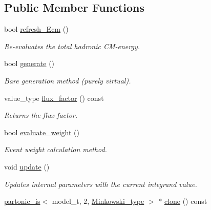 \subsection*{Public Member Functions}
\begin{DoxyCompactItemize}
\item 
\hypertarget{a00414_a5e0fcbdf96342a44eabb3c1c96d237b7}{}bool \hyperlink{a00414_a5e0fcbdf96342a44eabb3c1c96d237b7}{refresh\+\_\+\+Ecm} ()\label{a00414_a5e0fcbdf96342a44eabb3c1c96d237b7}

\begin{DoxyCompactList}\small\item\em Re-\/evaluates the total hadronic C\+M-\/energy. \end{DoxyCompactList}\item 
bool \hyperlink{a00414_a75c572d16c6a484490a70d799a24b600}{generate} ()
\begin{DoxyCompactList}\small\item\em \textquotesingle{}Bare generation\textquotesingle{} method (purely virtual). \end{DoxyCompactList}\item 
\hypertarget{a00414_a025119eeaf845bf23c75fe3a94d5ddd6}{}value\+\_\+type \hyperlink{a00414_a025119eeaf845bf23c75fe3a94d5ddd6}{flux\+\_\+factor} () const \label{a00414_a025119eeaf845bf23c75fe3a94d5ddd6}

\begin{DoxyCompactList}\small\item\em Returns the flux factor. \end{DoxyCompactList}\item 
\hypertarget{a00414_aa1255edc9ce6fa8c2bcf84ed1c3f0ad8}{}bool \hyperlink{a00414_aa1255edc9ce6fa8c2bcf84ed1c3f0ad8}{evaluate\+\_\+weight} ()\label{a00414_aa1255edc9ce6fa8c2bcf84ed1c3f0ad8}

\begin{DoxyCompactList}\small\item\em Event weight calculation method. \end{DoxyCompactList}\item 
\hypertarget{a00414_ab005a584cf9cbd70336fe03a7840e61c}{}void \hyperlink{a00414_ab005a584cf9cbd70336fe03a7840e61c}{update} ()\label{a00414_ab005a584cf9cbd70336fe03a7840e61c}

\begin{DoxyCompactList}\small\item\em Updates internal parameters with the current integrand value. \end{DoxyCompactList}\item 
\hypertarget{a00414_a1c44965bba62f5840085dec199ba2b33}{}\hyperlink{a00412}{partonic\+\_\+is}$<$ model\+\_\+t, 2, \hyperlink{a00371}{Minkowski\+\_\+type} $>$ $\ast$ \hyperlink{a00414_a1c44965bba62f5840085dec199ba2b33}{clone} () const \label{a00414_a1c44965bba62f5840085dec199ba2b33}


\end{DoxyCompactItemize}
